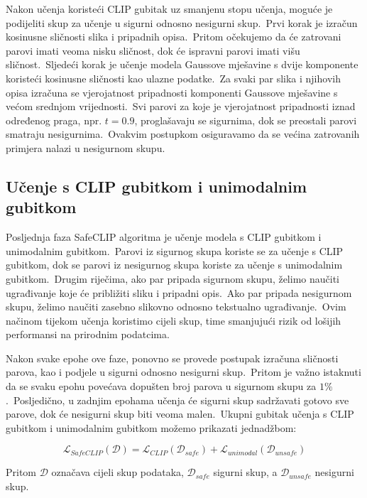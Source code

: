 \documentclass[times, utf8, seminar, numeric]{fer}
\begin{document}
Nakon učenja koristeći CLIP gubitak uz smanjenu stopu učenja, moguće je podijeliti skup za učenje u sigurni odnosno nesigurni skup.\ 
Prvi korak je izračun kosinusne sličnosti slika i pripadnih opisa.\ Pritom očekujemo da će zatrovani parovi imati veoma nisku sličnost, dok će ispravni parovi imati višu sličnost.\ 
Sljedeći korak je učenje modela Gaussove mješavine s dvije komponente koristeći kosinusne sličnosti kao ulazne podatke.\ Za svaki par slika i njihovih opisa izračuna se vjerojatnost pripadnosti komponenti Gaussove mješavine s većom srednjom vrijednosti.\ 
Svi parovi za koje je vjerojatnost pripadnosti iznad određenog praga, npr. $t = 0.9$, proglašavaju se sigurnima, dok se preostali parovi smatraju nesigurnima.\ 
Ovakvim postupkom osiguravamo da se većina zatrovanih primjera nalazi u nesigurnom skupu.\ 

\subsection{Učenje s CLIP gubitkom i unimodalnim gubitkom}

Posljednja faza SafeCLIP algoritma je učenje modela s CLIP gubitkom i unimodalnim gubitkom.\ 
Parovi iz sigurnog skupa koriste se za učenje s CLIP gubitkom, dok se parovi iz nesigurnog skupa koriste za učenje s unimodalnim gubitkom.\ 
Drugim riječima, ako par pripada sigurnom skupu, želimo naučiti ugrađivanje koje će približiti sliku i pripadni opis.\ 
Ako par pripada nesigurnom skupu, želimo naučiti zasebno slikovno odnosno tekstualno ugrađivanje.\ Ovim načinom tijekom učenja koristimo cijeli skup, time smanjujući rizik od lošijih performansi na prirodnim podatcima.\ 
  
Nakon svake epohe ove faze, ponovno se provede postupak izračuna sličnosti parova, kao i podjele u sigurni odnosno nesigurni skup.\ 
Pritom je važno istaknuti da se svaku epohu povećava dopušten broj parova u sigurnom skupu za $1\%$.\
Posljedično, u zadnjim epohama učenja će sigurni skup sadržavati gotovo sve parove, dok će nesigurni skup biti veoma malen.\ 
Ukupni gubitak učenja s CLIP gubitkom i unimodalnim gubitkom možemo prikazati jednadžbom:

\begin{equation}
    \mathcal{L}_{SafeCLIP}(\mathcal{D}) = \mathcal{L}_{CLIP}(\mathcal{D}_{safe}) + \mathcal{L}_{unimodal}(\mathcal{D}_{unsafe})
    \label{eq:total_loss}
\end{equation}

Pritom $\mathcal{D}$ označava cijeli skup podataka, $\mathcal{D}_{safe}$ sigurni skup, a $\mathcal{D}_{unsafe}$ nesigurni skup.\
\end{document}
